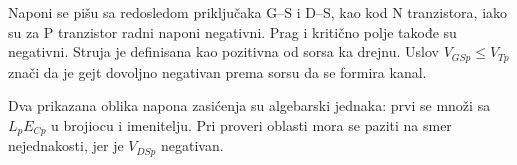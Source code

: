 Naponi se pišu sa redosledom priključaka G–S i D–S, kao kod N tranzistora, iako su za P tranzistor radni naponi negativni. Prag i kritično polje takođe su negativni. Struja je definisana kao pozitivna od sorsa ka drejnu. Uslov $V_{GSp}\leq V_{Tp}$ znači da je gejt dovoljno negativan prema sorsu da se formira kanal.

Dva prikazana oblika napona zasićenja su algebarski jednaka: prvi se množi sa $L_pE_{Cp}$ u brojiocu i imenitelju. Pri proveri oblasti mora se paziti na smer nejednakosti, jer je $V_{DSp}$ negativan.
